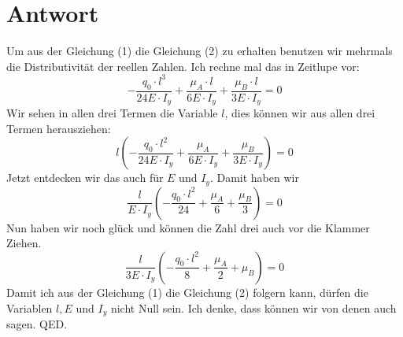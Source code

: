 \documentclass[11pt, a4paper]{article}
\begin{document}
\section{Antwort}
Um aus der Gleichung (1) die Gleichung (2) zu erhalten benutzen wir mehrmals die
Distributivität der reellen Zahlen. Ich rechne mal das in Zeitlupe vor:
\[
    -\frac{q_0\cdot l^3}{24E\cdot I_y} + \frac{\mu_A\cdot l}{6E\cdot I_y} +
    \frac{\mu_B\cdot l}{3E\cdot I_y} = 0
\]
Wir sehen in allen drei Termen die Variable $l$, dies können wir aus allen drei
Termen herausziehen:
\[
    l\left(-\frac{q_0\cdot l^2}{24E\cdot I_y} + \frac{\mu_A}{6E\cdot I_y} +
    \frac{\mu_B}{3E\cdot I_y}\right) = 0
\]
Jetzt entdecken wir das auch für $E$ und $I_y$. Damit haben wir
\[
    \frac{l}{E\cdot I_y}\left(-\frac{q_0\cdot l^2}{24} + \frac{\mu_A}{6} +
    \frac{\mu_B}{3}\right) = 0
\]
Nun haben wir noch glück und können die Zahl drei auch vor die Klammer Ziehen.
\[
    \frac{l}{3E\cdot I_y}\left(-\frac{q_0\cdot l^2}{8} + \frac{\mu_A}{2} +
    \mu_B\right) = 0
\]
Damit ich aus der Gleichung (1) die Gleichung (2) folgern kann, dürfen die
Variablen $l, E$ und $I_y$ nicht Null sein. Ich denke, dass können wir von denen
auch sagen. QED.
\end{document}
